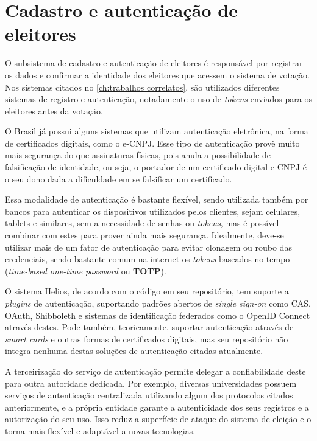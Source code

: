 \section{Cadastro e autenticação de eleitores}

O subsistema de cadastro e autenticação de eleitores é responsável por
registrar os dados e confirmar a identidade dos eleitores que acessem o sistema
de votação. Nos sistemas citados no \autoref{ch:trabalhos correlatos}, são
utilizados diferentes sistemas de registro e autenticação, notadamente o uso de
\textit{tokens} enviados para os eleitores antes da votação.

O Brasil já possui alguns sistemas que utilizam autenticação eletrônica, na
forma de certificados digitais, como o e-CNPJ. Esse tipo de autenticação provê
muito mais segurança do que assinaturas físicas, pois anula a possibilidade de
falsificação de identidade, ou seja, o portador de um certificado digital
e-CNPJ é o seu dono dada a dificuldade em se falsificar um certificado.

Essa modalidade de autenticação é bastante flexível, sendo utilizada também por
bancos para autenticar os dispositivos utilizados pelos clientes, sejam
celulares, tablets e similares, sem a necessidade de senhas ou \textit{tokens},
mas é possível combinar com estes para prover ainda mais segurança. Idealmente,
deve-se utilizar mais de um fator de autenticação para evitar clonagem ou roubo
das credenciais, sendo bastante comum na internet os \textit{tokens} baseados
no tempo (\textit{time-based one-time password} ou \textbf{TOTP}).

O sistema Helios, de acordo com o código em seu repositório, tem suporte a
\textit{plugins} de autenticação, suportando padrões abertos de
\textit{single sign-on} como CAS, OAuth, Shibboleth e sistemas de identificação
federados como o OpenID Connect através destes. Pode também, teoricamente,
suportar autenticação através de \textit{smart cards} e outras formas de
certificados digitais, mas seu repositório não integra nenhuma destas soluções
de autenticação citadas atualmente.

A terceirização do serviço de autenticação permite delegar a confiabilidade
deste para outra autoridade dedicada. Por exemplo, diversas universidades
possuem serviços de autenticação centralizada utilizando algum dos protocolos
citados anteriormente, e a própria entidade garante a autenticidade dos seus
registros e a autorização do seu uso. Isso reduz a superfície de ataque do
sistema de eleição e o torna mais flexível e adaptável a novas tecnologias.

